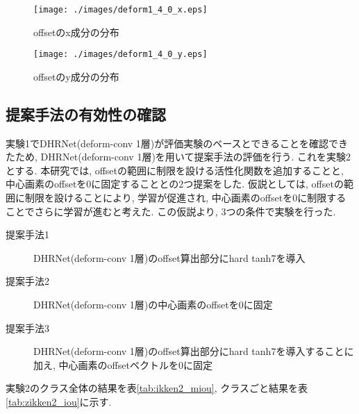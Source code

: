 \begin{figure}[H]
  \begin{center}
  \texttt{[image: ./images/deform1\_4\_0\_x.eps]}
  \end{center}
  \caption{offsetのx成分の分布}
  \label{fig:def1_4_x}
\end{figure}

\begin{figure}[H]
  \begin{center}
  \texttt{[image: ./images/deform1\_4\_0\_y.eps]}
  \end{center}
  \caption{offsetのy成分の分布}
  \label{fig:def1_4_y}
\end{figure}


\subsection{提案手法の有効性の確認}
実験1でDHRNet(deform-conv 1層)が評価実験のベースとできることを確認できたため, DHRNet(deform-conv 1層)を用いて提案手法の評価を行う. これを実験2とする. 本研究では, offsetの範囲に制限を設ける活性化関数を追加することと, 中心画素のoffsetを0に固定することとの2つ提案をした.
仮説としては, offsetの範囲に制限を設けることにより, 学習が促進され, 中心画素のoffsetを0に制限することでさらに学習が進むと考えた. この仮説より, 3つの条件で実験を行った.

\begin{description}
   \item[提案手法1] DHRNet(deform-conv 1層)のoffset算出部分にhard tanh7を導入
   \item[提案手法2] DHRNet(deform-conv 1層)の中心画素のoffsetを0に固定
   \item[提案手法3] DHRNet(deform-conv 1層)のoffset算出部分にhard tanh7を導入することに加え, 中心画素のoffsetベクトルを0に固定
\end{description}

実験2のクラス全体の結果を表\ref{tab:ikken2_miou}, クラスごと結果を表\ref{tab:zikken2_iou}に示す.

